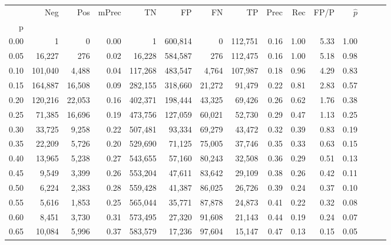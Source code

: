 \begin{tabular}{rrrrrrrrrrrrrrr}
\toprule
{} &      Neg &     Pos & mPrec &       TN &       FP &       FN &       TP &  Prec &   Rec &  FP/P & $\hat{p}$ \\
p    &          &         &       &          &          &          &          &       &       &       &           \\
\midrule
0.00 &        1 &       0 &  0.00 &        1 &  600,814 &        0 &  112,751 &  0.16 &  1.00 &  5.33 &      1.00 \\
0.05 &   16,227 &     276 &  0.02 &   16,228 &  584,587 &      276 &  112,475 &  0.16 &  1.00 &  5.18 &      0.98 \\
0.10 &  101,040 &   4,488 &  0.04 &  117,268 &  483,547 &    4,764 &  107,987 &  0.18 &  0.96 &  4.29 &      0.83 \\
0.15 &  164,887 &  16,508 &  0.09 &  282,155 &  318,660 &   21,272 &   91,479 &  0.22 &  0.81 &  2.83 &      0.57 \\
0.20 &  120,216 &  22,053 &  0.16 &  402,371 &  198,444 &   43,325 &   69,426 &  0.26 &  0.62 &  1.76 &      0.38 \\
0.25 &   71,385 &  16,696 &  0.19 &  473,756 &  127,059 &   60,021 &   52,730 &  0.29 &  0.47 &  1.13 &      0.25 \\
0.30 &   33,725 &   9,258 &  0.22 &  507,481 &   93,334 &   69,279 &   43,472 &  0.32 &  0.39 &  0.83 &      0.19 \\
0.35 &   22,209 &   5,726 &  0.20 &  529,690 &   71,125 &   75,005 &   37,746 &  0.35 &  0.33 &  0.63 &      0.15 \\
0.40 &   13,965 &   5,238 &  0.27 &  543,655 &   57,160 &   80,243 &   32,508 &  0.36 &  0.29 &  0.51 &      0.13 \\
0.45 &    9,549 &   3,399 &  0.26 &  553,204 &   47,611 &   83,642 &   29,109 &  0.38 &  0.26 &  0.42 &      0.11 \\
0.50 &    6,224 &   2,383 &  0.28 &  559,428 &   41,387 &   86,025 &   26,726 &  0.39 &  0.24 &  0.37 &      0.10 \\
0.55 &    5,616 &   1,853 &  0.25 &  565,044 &   35,771 &   87,878 &   24,873 &  0.41 &  0.22 &  0.32 &      0.08 \\
0.60 &    8,451 &   3,730 &  0.31 &  573,495 &   27,320 &   91,608 &   21,143 &  0.44 &  0.19 &  0.24 &      0.07 \\
0.65 &   10,084 &   5,996 &  0.37 &  583,579 &   17,236 &   97,604 &   15,147 &  0.47 &  0.13 &  0.15 &      0.05 \\

\end{tabular}
